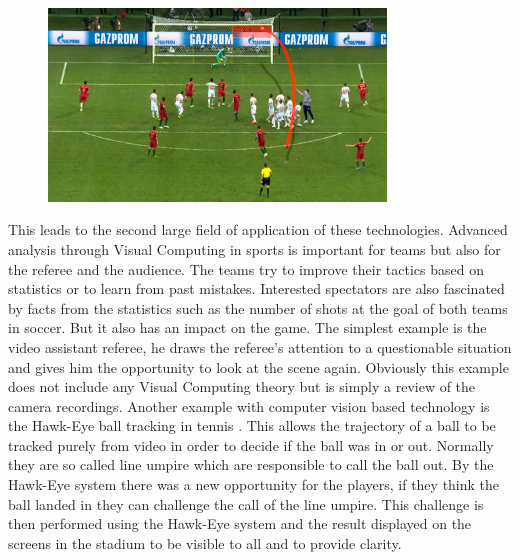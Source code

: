 \begin{figure}[h]
	\centering
	\includegraphics[width=0.8\textwidth]{./images/freekick.jpg}
	\label{fig:freekick}
\end{figure}
This leads to the second large field of application of these technologies. Advanced analysis through Visual Computing in sports is important for teams but also for the referee and the audience. The teams try to improve their tactics based on statistics or to learn from past mistakes. Interested spectators are also fascinated by facts from the statistics such as the number of shots at the goal of both teams in soccer. But it also has an impact on the game. The simplest example is the video assistant referee, he draws the referee's attention to a questionable situation and gives him the opportunity to look at the scene again. Obviously this example does not include any Visual Computing theory but is simply a review of the camera recordings.   Another example with computer vision based technology is the Hawk-Eye ball tracking in tennis \cite{hawk}. This allows the trajectory of a ball to be tracked purely from video in order to decide if the ball was in or out. Normally they are so called line umpire which are responsible to call the ball out. By the Hawk-Eye system there was a new opportunity for the players, if they think the ball landed in they can challenge the call of the line umpire. This challenge is then performed using the Hawk-Eye system and the result displayed on the screens in the stadium to be visible to all and to provide clarity. 




